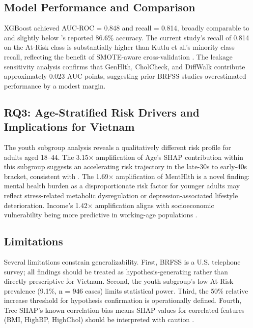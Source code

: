 ﻿\documentclass[12pt,a4paper]{article}
\begin{document}
\subsection{Model Performance and Comparison}

XGBoost achieved AUC-ROC = 0.848 and recall = 0.814, broadly comparable to
\citet{Majcherek2025} and slightly below \citet{Kutlu2024}'s reported 86.6\% accuracy.
The current study's recall of 0.814 on the At-Risk class is substantially higher than
Kutlu et al.'s minority class recall, reflecting the benefit of SMOTE-aware cross-validation
\citep{Netayawijit2025, Rezki2024}. The leakage sensitivity analysis confirms that
GenHlth, CholCheck, and DiffWalk contribute approximately 0.023 AUC points, suggesting
prior BRFSS studies overestimated performance by a modest margin.

\subsection{RQ3: Age-Stratified Risk Drivers and Implications for Vietnam}

The youth subgroup analysis reveals a qualitatively different risk profile for adults aged
18--44. The 3.15$\times$ amplification of Age's SHAP contribution within this subgroup
suggests an accelerating risk trajectory in the late-30s to early-40s bracket, consistent
with \citet{Nguyen2015}. The 1.69$\times$ amplification of MentHlth is a novel finding:
mental health burden as a disproportionate risk factor for younger adults may reflect
stress-related metabolic dysregulation or depression-associated lifestyle deterioration.
Income's 1.42$\times$ amplification aligns with socioeconomic vulnerability being more
predictive in working-age populations \citep{Vuong2024}.

\subsection{Limitations}

Several limitations constrain generalizability. First, BRFSS is a U.S. telephone survey;
all findings should be treated as hypothesis-generating rather than directly prescriptive
for Vietnam. Second, the youth subgroup's low At-Risk prevalence (9.1\%, n = 946 cases)
limits statistical power. Third, the 50\% relative increase threshold for hypothesis
confirmation is operationally defined. Fourth, Tree SHAP's known correlation bias means
SHAP values for correlated features (BMI, HighBP, HighChol) should be interpreted with
caution \citep{Lundberg2019, AlHudaibi2025}.
\end{document}
